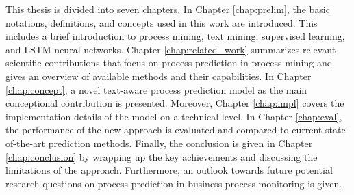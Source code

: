 This thesis is divided into seven chapters.
In Chapter \ref{chap:prelim}, the basic notations, definitions, and concepts used in this work are introduced.
This includes a brief introduction to process mining, text mining, supervised learning, and LSTM neural networks.
Chapter \ref{chap:related_work} summarizes relevant scientific contributions that focus on process prediction in process mining and gives an overview of available methods and their capabilities.
In Chapter \ref{chap:concept}, a novel text-aware process prediction model as the main conceptional contribution is presented.
Moreover, Chapter \ref{chap:impl} covers the implementation details of the model on a technical level.
In Chapter \ref{chap:eval}, the performance of the new approach is evaluated and compared to current state-of-the-art prediction methods.
Finally, the conclusion is given in Chapter \ref{chap:conclusion} by wrapping up the key achievements and discussing the limitations of the approach.
Furthermore, an outlook towards future potential research questions on process prediction in business process monitoring is given.